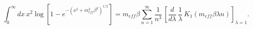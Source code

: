 \begin{equation}
\int _{0}^{\infty }dx\, x^{2}\log \left[1-e^{-\left(x^{2}+m_{eff}^{2}\beta ^{2}\right)^{1/2}}\right]=m_{eff}\beta \sum _{n=1}^{\infty }\frac{1}{n^{3}}\, \left[\frac{d}{d\lambda }\, \frac{1}{\lambda }\, K_{1}\left(m_{eff}\beta \lambda n\right)\right]_{\lambda =1}.\end{equation}

